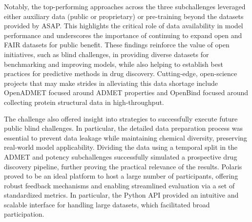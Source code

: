 \documentclass[journal=jcim,manuscript=article]{achemso}
\begin{document}
Notably, the top-performing approaches across the three subchallenges leveraged either auxiliary data (public or proprietary) or pre-training beyond the datasets provided by ASAP. This highlights the critical role of data availability in model performance and underscores the importance of continuing to expand open and FAIR datasets for public benefit. These findings reinforce the value of open initiatives, such as blind challenges, in providing diverse datasets for benchmarking and improving models, while also helping to establish best practices for predictive methods in drug discovery. Cutting-edge, open-science projects that may make strides in alleviating this data shortage include OpenADMET focused around ADMET properties and OpenBind focused around collecting protein structural data in high-throughput.

The challenge also offered insight into strategies to successfully execute future public blind challenges. In particular, the detailed data preparation process was essential to prevent data leakage while maintaining chemical diversity, preserving real-world model applicability. Dividing the data using a temporal split in the ADMET and potency subchallenges successfully simulated a prospective drug discovery pipeline, further proving the practical relevance of the results.
Polaris proved to be an ideal platform to host a large number of participants, offering robust feedback mechanisms and enabling streamlined evaluation via a set of standardized metrics. In particular, the Python API provided an intuitive and scalable interface for handling large datasets, which facilitated broad participation. 
\end{document}
